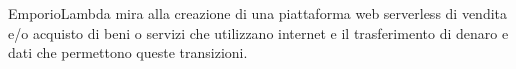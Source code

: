 EmporioLambda mira alla creazione di una piattaforma web serverless di vendita e/o acquisto di beni o servizi che utilizzano internet e il trasferimento di denaro e dati che permettono queste transizioni.